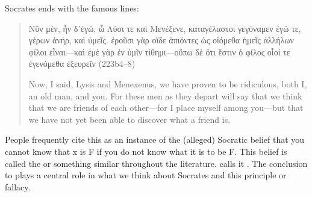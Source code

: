 \documentclass[11pt]{article}
\begin{document}
Socrates ends with the famous lines:

\begin{quote}

    {\g Νῦν μέν, ἦν δ᾽ἐγώ, ὦ Λύσι τε καὶ Μενέξενε, καταγέλαστοι γεγόναμεν
        ἐγώ τε, γέρων ἀνήρ, καὶ ὑμεῖς.  ἐροῦσι γὰρ οἵδε ἀπιόντες ὡς οἰόμεθα
        ἡμεῖς ἀλλήλων φίλοι εἶναι---καὶ ἐμὲ γὰρ ἐν ὑμῖν τίθημι---οὔπω δὲ
        ὅτι ἔστιν ὁ φίλος οἷοί τε ἐγενόμεθα ἐξευρεῖν} (223b4--8)

    Now, I said, Lysis and Menexenus, we have proven to be ridiculous, both
    I, an old man, and you.  For these men as they depart will say that we
    think that we are friends of each other---for I place myself among
    you---but that we have not yet been able to discover what a friend is.

\end{quote}

People frequently cite this as an instance of the (alleged) Socratic belief
that you cannot know that x is F if you do not know what it is to be F.
This belief is called the  or something
similar throughout the literature.  \citet{geach1966} calls it .  The conclusion to  plays a central role in
what we think about Socrates and this principle or fallacy.



\newpage


\end{document}
